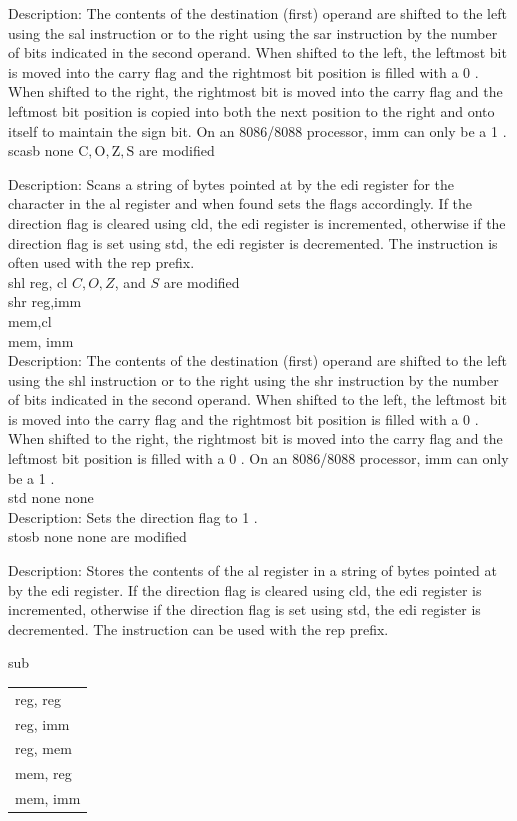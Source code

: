 \documentclass[10pt]{book}
\begin{document}
Description: The contents of the destination (first) operand are shifted to the left using the sal instruction or to the right using the sar instruction by the number of bits indicated in the second operand. When shifted to the left, the leftmost bit is moved into the carry flag and the rightmost bit position is filled with a 0 . When shifted to the right, the rightmost bit is moved into the carry flag and the leftmost bit position is copied into both the next position to the right and onto itself to maintain the sign bit. On an 8086/8088 processor, imm can only be a 1 .\\
scasb none $\mathrm{C}, \mathrm{O}, \mathrm{Z}, \mathrm{S}$ are modified

Description: Scans a string of bytes pointed at by the edi register for the character in the al register and when found sets the flags accordingly. If the direction flag is cleared using cld, the edi register is incremented, otherwise if the direction flag is set using std, the edi register is decremented. The instruction is often used with the rep prefix.\\
shl reg, cl $C, O, Z$, and $S$ are modified\\
shr reg,imm\\
mem,cl\\
mem, imm\\
Description: The contents of the destination (first) operand are shifted to the left using the shl instruction or to the right using the shr instruction by the number of bits indicated in the second operand. When shifted to the left, the leftmost bit is moved into the carry flag and the rightmost bit position is filled with a 0 . When shifted to the right, the rightmost bit is moved into the carry flag and the leftmost bit position is filled with a 0 . On an 8086/8088 processor, imm can only be a 1 .\\
std none none\\
Description: Sets the direction flag to 1 .\\
stosb none none are modified

Description: Stores the contents of the al register in a string of bytes pointed at by the edi register. If the direction flag is cleared using cld, the edi register is incremented, otherwise if the direction flag is set using std, the edi register is decremented. The instruction can be used with the rep prefix.

sub \begin{tabular}{l}
reg, reg \\
reg, imm \\
reg, mem \\
mem, reg \\
mem, imm \\
\end{tabular}
\end{document}
